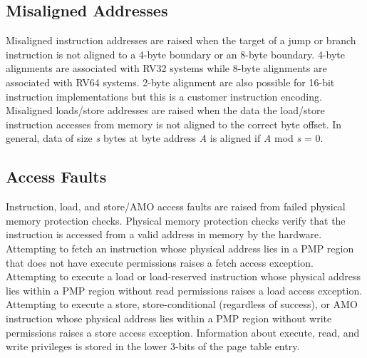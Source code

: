 \documentclass[12pt]{article}
\begin{document}
\subsection{Misaligned Addresses}
Misaligned instruction addresses are raised when the target of a jump or branch instruction is not aligned to a 4-byte boundary or an 8-byte boundary. 4-byte alignments are associated with RV32 systems while 8-byte alignments are associated with RV64 systems. 2-byte alignment are also possible for 16-bit instruction implementations but this is a customer instruction encoding. Misaligned loads/store addresses are raised when the data the load/store instruction accesses from memory is not aligned to the correct byte offset. In general, data of size \emph{s} bytes at byte address \emph{A} is aligned if \emph{A} mod \emph{s} = 0.

\subsection{Access Faults}
Instruction, load, and store/AMO access faults are raised from failed physical memory protection checks. Physical memory protection checks verify that the instruction is accessed from a valid address in memory by the hardware. Attempting to fetch an instruction whose physical address lies in a PMP region that does not have execute permissions raises a fetch access exception. Attempting to execute a load or load-reserved instruction whose physical address lies within a PMP region without read permissions raises a load access exception. Attempting to execute a store, store-conditional (regardless of success), or AMO instruction whose physical address lies within a PMP region without write permissions raises a store access exception. Information about execute, read, and write privileges is stored in the lower 3-bits of the page table entry. 
\end{document}
